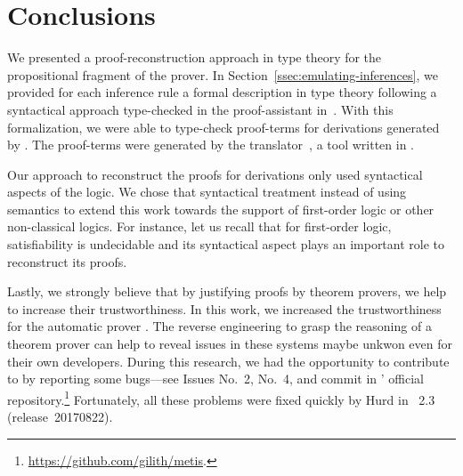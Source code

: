 \documentclass[../paper.tex]{subfiles}
\begin{document}

\section{Conclusions}
\label{sec:conclusions}

We presented a proof-reconstruction approach in type theory for the
propositional fragment of the \Metis prover. In
Section~\ref{ssec:emulating-inferences}, we provided for each \Metis inference
rule a formal description in type theory following a syntactical approach
type-checked in the proof-assistant \Agda in~\cite{AgdaProp,AgdaMetis}. With
this formalization, we were able to type-check \Agda proof-terms for
\TSTP derivations generated by \Metis. The \Agda proof-terms were generated by
the \Athena translator~\cite{Athena}, a tool written in \Haskell.


Our approach to reconstruct the proofs for \Metis \TSTP derivations only used
syntactical aspects of the logic. We chose that syntactical treatment instead of
using semantics to extend this work towards the support of first-order logic or
other non-classical logics. For instance, let us recall that
for first-order logic, satisfiability is undecidable and its syntactical aspect
plays an important role to reconstruct its proofs.

Lastly, we strongly believe that by justifying proofs by theorem provers, we
help to increase their trustworthiness. In this work, we increased the
trustworthiness for the automatic prover \Metis. The reverse engineering to
grasp the reasoning of a theorem prover can help to reveal issues in these
systems maybe unkwon even for their own developers. During this research, we had
the opportunity to contribute to \Metis by reporting some bugs---see Issues
No.~2, No.~4, and commit  in \Metis' official
repository.\footnote{\url{https://github.com/gilith/metis}.} Fortunately, all
these problems were fixed quickly by Hurd in \Metis~2.3 (release~20170822).
\end{document}
